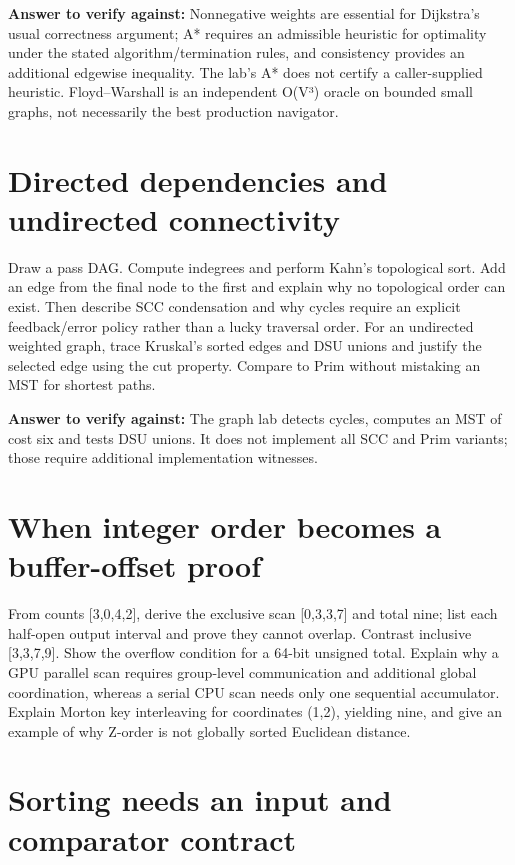 \textbf{Answer to verify against:} Nonnegative weights are essential for Dijkstra's usual correctness argument; A* requires an admissible heuristic for optimality under the stated algorithm/termination rules, and consistency provides an additional edgewise inequality. The lab's A* does not certify a caller-supplied heuristic. Floyd--Warshall is an independent O(V³) oracle on bounded small graphs, not necessarily the best production navigator.

\section{Directed dependencies and undirected connectivity}\label{appendix-8a046b38375e-directed-dependencies-and-undirected-connectivity}

Draw a pass DAG. Compute indegrees and perform Kahn's topological sort. Add an edge from the final node to the first and explain why no topological order can exist. Then describe SCC condensation and why cycles require an explicit feedback/error policy rather than a lucky traversal order. For an undirected weighted graph, trace Kruskal's sorted edges and DSU unions and justify the selected edge using the cut property. Compare to Prim without mistaking an MST for shortest paths.

\textbf{Answer to verify against:} The graph lab detects cycles, computes an MST of cost six and tests DSU unions. It does not implement all SCC and Prim variants; those require additional implementation witnesses.

\section{When integer order becomes a buffer-offset proof}\label{appendix-8a046b38375e-when-integer-order-becomes-a-buffer-offset-proof}

From counts {[}3,0,4,2{]}, derive the exclusive scan {[}0,3,3,7{]} and total nine; list each half-open output interval and prove they cannot overlap. Contrast inclusive {[}3,3,7,9{]}. Show the overflow condition for a 64-bit unsigned total. Explain why a GPU parallel scan requires group-level communication and additional global coordination, whereas a serial CPU scan needs only one sequential accumulator. Explain Morton key interleaving for coordinates (1,2), yielding nine, and give an example of why Z-order is not globally sorted Euclidean distance.

\section{Sorting needs an input and comparator contract}\label{appendix-8a046b38375e-sorting-needs-an-input-and-comparator-contract}

